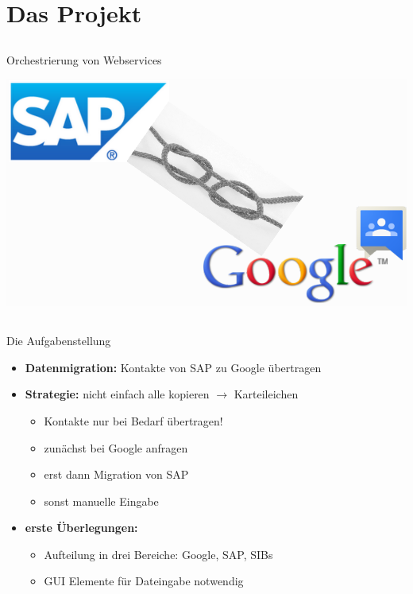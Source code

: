 \section{Das Projekt}

\subsection*{}
\begin{frame}{Orchestrierung von Webservices}
	
\begin{center}
\includegraphics[width=\textheight]{Bilder/titel_einfuehrung_logos.png} 
\end{center}

\end{frame}

\subsection*{}
\begin{frame}{Die Aufgabenstellung}
\begin{itemize}
	\item \textbf{Datenmigration:} Kontakte von SAP zu Google übertragen
	\pause
	\item \textbf{Strategie:} nicht einfach alle kopieren $\rightarrow$ Karteileichen
		\begin{itemize}
			\item Kontakte nur bei Bedarf übertragen!
			\pause
			\item zunächst bei Google anfragen
			\item erst dann Migration von SAP
			\item sonst manuelle Eingabe
		\end{itemize}
	\pause
	\item \textbf{erste Überlegungen:}
		\begin{itemize}
			\item Aufteilung in drei Bereiche: Google, SAP, SIBs
			\item GUI Elemente für Dateingabe notwendig
		\end{itemize}

\end{itemize}
\end{frame}



